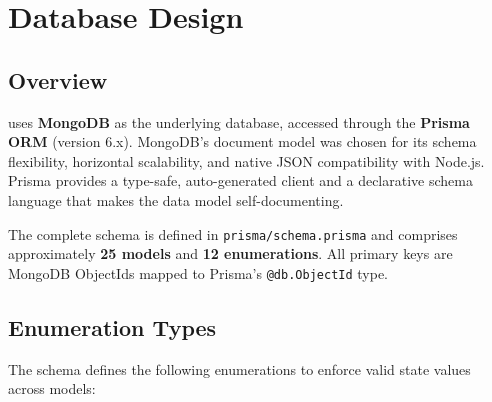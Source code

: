 \chapter{Database Design}

\section{Overview}

\projectname{} uses \textbf{MongoDB} as the underlying database, accessed through the \textbf{Prisma ORM} (version 6.x). MongoDB's document model was chosen for its schema flexibility, horizontal scalability, and native JSON compatibility with Node.js. Prisma provides a type-safe, auto-generated client and a declarative schema language that makes the data model self-documenting.

The complete schema is defined in \texttt{prisma/schema.prisma} and comprises approximately \textbf{25 models} and \textbf{12 enumerations}. All primary keys are MongoDB ObjectIds mapped to Prisma's \texttt{@db.ObjectId} type.

\section{Enumeration Types}

The schema defines the following enumerations to enforce valid state values across models:

